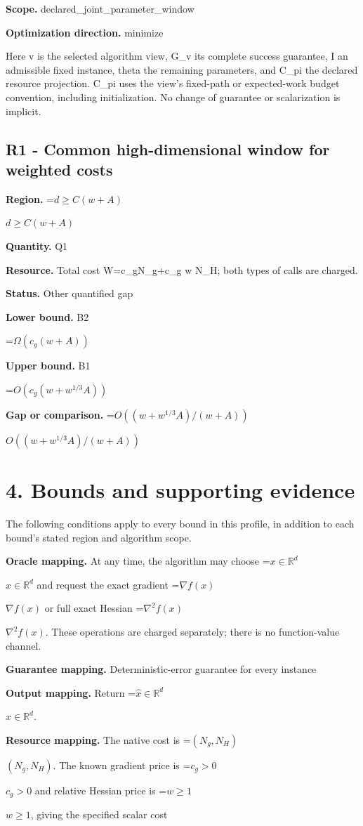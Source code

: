 \documentclass[10pt,a4paper]{article}
\newcommand{\AtlasMath}[1]{\par\begingroup\centering\setbox0=\hbox{$\displaystyle #1$}\ifdim\wd0>1.4\linewidth\typeout{ATLAS WIDE FORMULA: \the\wd0}\fi\ifdim\wd0>\linewidth\resizebox{\linewidth}{!}{\box0}\else\box0\fi\par\endgroup}
\newcommand{\AtlasInlineMath}[1]{\begingroup\setbox0=\hbox{$#1$}\ifdim\wd0>.4\linewidth\endgroup\AtlasMath{#1}\else\endgroup$#1$\fi}
\begin{document}
\textbf{Scope.} declared\_joint\_parameter\_window

\textbf{Optimization direction.} minimize

Here v is the selected algorithm view, G\_v its complete success guarantee, I an admissible fixed instance, theta the remaining parameters, and C\_pi the declared resource projection. C\_pi uses the view's fixed-path or expected-work budget convention, including initialization. No change of guarantee or scalarization is implicit.

\subsection{R1 - Common high-dimensional window for weighted costs}
\textbf{Region.} \AtlasInlineMath{d\ge C(w+A)}

\textbf{Quantity.} Q1

\textbf{Resource.} Total cost W=c\_gN\_g+c\_g w N\_H; both types of calls are charged.

\textbf{Status.} Other quantified gap

\textbf{Lower bound.} B2

\AtlasMath{\Omega(c_g(w+A))}
\textbf{Upper bound.} B1

\AtlasMath{O(c_g(w+w^{1/3}A))}
\textbf{Gap or comparison.} \AtlasInlineMath{O((w+w^{1/3}A)/(w+A))}

\section{4. Bounds and supporting evidence}
The following conditions apply to every bound in this profile, in addition to each bound's stated region and algorithm scope.

\textbf{Oracle mapping.} At any time, the algorithm may choose \AtlasInlineMath{x\in\mathbb{R}^d} and request the exact gradient \AtlasInlineMath{\nabla f(x)} or full exact Hessian \AtlasInlineMath{\nabla^2f(x)}. These operations are charged separately; there is no function-value channel.

\textbf{Guarantee mapping.} Deterministic-error guarantee for every instance

\textbf{Output mapping.} Return \AtlasInlineMath{\widehat{x}\in \mathbb{R}^d}.

\textbf{Resource mapping.} The native cost is \AtlasInlineMath{(N_g,N_H)}. The known gradient price is \AtlasInlineMath{c_g>0} and relative Hessian price is \AtlasInlineMath{w\ge1}, giving the specified scalar cost
\end{document}
